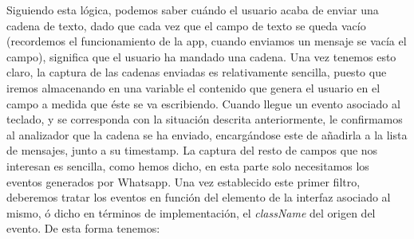 \documentclass[12pt,a4paper,oneside]{book} %
\begin{document}
\newline \newline 
Siguiendo esta lógica, podemos saber cuándo el usuario acaba de enviar una cadena de texto, dado que cada vez que el campo de texto se queda vacío (recordemos el funcionamiento de la app, cuando enviamos un mensaje se vacía el campo), significa que el usuario ha mandado una cadena. 
\newline \newline 
Una vez tenemos esto claro, la captura de las cadenas enviadas es relativamente sencilla, puesto que iremos almacenando en una variable el contenido que genera el usuario en el campo a medida que éste se va escribiendo. Cuando llegue un evento asociado al teclado, y se corresponda con la situación descrita anteriormente, le confirmamos al analizador que la cadena se ha enviado, encargándose este de añadirla a la lista de mensajes, junto a su timestamp. 
\newline \newline 
La captura del resto de campos que nos interesan es sencilla, como hemos dicho, en esta parte solo necesitamos los eventos generados por Whatsapp. Una vez establecido este primer filtro, deberemos tratar los eventos en función del elemento de la interfaz asociado al mismo, ó dicho en términos de implementación, el \textit{className} del origen del evento. De esta forma tenemos: 
\end{document}
